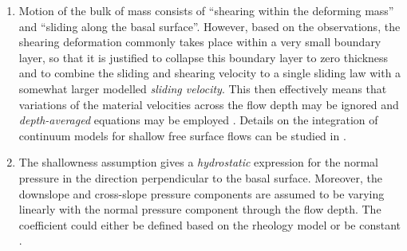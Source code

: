 \documentclass{article}
\begin{document}
\begin{enumerate}
\item Motion of the bulk of mass consists of ``shearing within the deforming mass'' and ``sliding along the basal surface''. However, based on the observations, the shearing deformation commonly takes place within a very small boundary layer, so that it is justified to collapse this boundary layer to zero thickness and to combine the sliding and shearing velocity to a single sliding law with a somewhat larger modelled \textit{sliding velocity}. This then effectively means that variations of the material velocities across the flow depth may be ignored and \textit{depth-averaged} equations may be employed \citep{SavageHutter1989,Hutter1993}. Details on the integration of continuum models for shallow free surface flows can be studied in \citep{PudasainiHutter2007}.%
\item The shallowness assumption gives a \textit{hydrostatic} expression for the normal pressure in the direction perpendicular to the basal surface. Moreover, the downslope and cross-slope pressure components are assumed to be varying linearly with the normal pressure component through the flow depth. The coefficient could either be defined based on the rheology model or be constant \citep{SavageHutter1989,Bartelt1999,Iverson2001,Denlinger2001}.
\end{enumerate}
\end{document}

